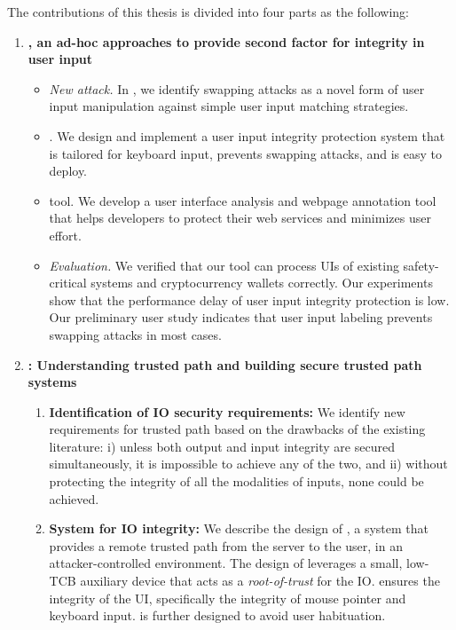 The contributions of this thesis is divided into four parts as the following:

\begin{enumerate}
  \item \textbf{\integrikey, an ad-hoc approaches to provide second factor for integrity in user input}
\begin{itemize}
    \item \emph{New attack.} In \integrikey, we identify swapping attacks as a novel form of user input manipulation against simple user input matching strategies.
    \item \integrikey. We design and implement a user input integrity protection system that is tailored for keyboard input, prevents swapping attacks, and is easy to deploy.
    \item \integrikey{} tool. We develop a user interface analysis and webpage annotation tool that helps developers to protect their web services and minimizes user effort.
    \item \emph{Evaluation.} We verified that our tool can process UIs of existing safety-critical systems and cryptocurrency wallets correctly. Our experiments show that the performance delay of \integrikey user input integrity protection is low. Our preliminary user study indicates that user input labeling prevents swapping attacks in most cases.
\end{itemize}



    \item \textbf{\protection: Understanding trusted path and building secure trusted path systems}
    \begin{enumerate}
        \item  \textbf{Identification of IO security requirements:} We identify new requirements for trusted path based on the drawbacks of the existing literature: i) unless both output and input integrity are secured simultaneously, it is impossible to achieve any of the two, and ii) without protecting the integrity of all the modalities of inputs, none could be achieved.
        
        \item \textbf{System for IO integrity:} We describe the design of \protection, a system that provides a remote trusted path from the server to the user, in an attacker-controlled environment. The design of \protection leverages a small, low-TCB auxiliary device that acts as a \emph{root-of-trust} for the IO. \protection ensures the integrity of the UI, specifically the integrity of mouse pointer and keyboard input. \protection is further designed to avoid user habituation.
        

\end{enumerate}
\end{enumerate}
